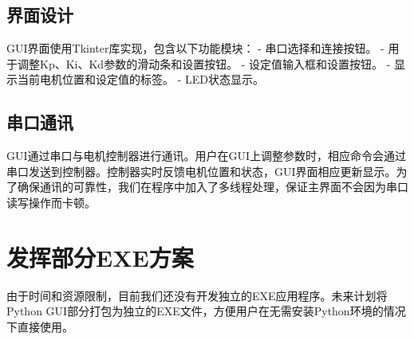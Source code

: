 \documentclass{article}
\begin{document}
\subsection{界面设计}
GUI界面使用Tkinter库实现，包含以下功能模块：
- 串口选择和连接按钮。
- 用于调整Kp、Ki、Kd参数的滑动条和设置按钮。
- 设定值输入框和设置按钮。
- 显示当前电机位置和设定值的标签。
- LED状态显示。

\subsection{串口通讯}
GUI通过串口与电机控制器进行通讯。用户在GUI上调整参数时，相应命令会通过串口发送到控制器。控制器实时反馈电机位置和状态，GUI界面相应更新显示。为了确保通讯的可靠性，我们在程序中加入了多线程处理，保证主界面不会因为串口读写操作而卡顿。

\section{发挥部分EXE方案}
由于时间和资源限制，目前我们还没有开发独立的EXE应用程序。未来计划将Python GUI部分打包为独立的EXE文件，方便用户在无需安装Python环境的情况下直接使用。
\end{document}
